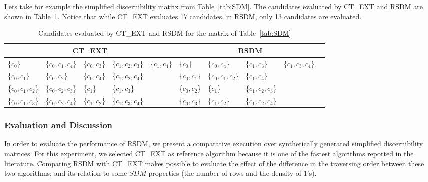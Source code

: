 \documentclass[authoryear,11pt]{elsarticle}
\begin{document}
	Lets take for example the simplified discernibility matrix from Table~\ref{tab:SDM}. The candidates evaluated 
	by CT\_EXT and RSDM  are shown in Table~\ref{tab:run}. Notice that while CT\_EXT evaluates 17 candidates,
	in RSDM, only 13 candidates are evaluated. 
	
	\begin{table}[!htb]\small
		\setlength{\tabcolsep}{.1em}
		\caption{Candidates evaluated by CT\_EXT and RSDM for the matrix of Table~\ref{tab:SDM}}\label{tab:run}
      	\centering
    		\begin{tabular}{|lllll|lllll|}
    		\hline
    		\multicolumn{5}{|c|}{CT\_EXT} & \multicolumn{5}{c|}{RSDM}\\
    		\hline
    		\{$ c_0$\} 	 		& \{$c_0,c_1,c_4$\}	& \{$c_0,c_3$\}		& \{$c_1,c_2,c_3$\}	& \{$c_1,c_4$\}	
    		& \{$c_0$\}			& \{$c_0,c_4$\} 		& \{$c_1,c_3$\} 		& \{$c_1,c_3,c_4$\}	&\\
    		\{$c_0,c_1$\} 		& \{$c_0,c_2$\}  	& \{$c_0,c_4$\}		& \{$c_1,c_2,c_4$\}	& 
    		& \{$c_0,c_1$\}		& \{$c_0,c_1,c_2$\} 	& \{$c_1,c_4$\}		&&\\
    		\{$c_0,c_1,c_2$\}	& \{$c_0,c_2,c_3$\}	& \{$c_1$\}			& \{$c_1,c_3$\}	  	&			
    		& \{$c_0,c_2$\} 		& \{$c_1$\}		 	& \{$c_1,c_2,c_3$\}	&&\\
    		\{$c_0,c_1,c_3$\} 	& \{$c_0,c_2,c_4$\}	& \{$c_1,c_2$\} 		& \{$c_1,c_3,c_4$\}	&			
    		& \{$c_0,c_3$\} 		& \{$c_1,c_2$\}	 	& \{$c_1,c_2,c_4$\}	&&\\
    		\hline
		\end{tabular}
	\end{table}

\subsubsection{Evaluation and Discussion}
	In order to evaluate the performance of RSDM, we present a comparative execution over synthetically generated 
	simplified discernibility matrices. For this experiment, we selected CT\_EXT as reference algorithm because 
	it is one of the fastest algorithms reported in the literature. Comparing RSDM with CT\_EXT makes possible to
	evaluate the effect of the difference in the traversing order between these two algorithms; and its relation 
	to some 	$SDM$ properties (the number of rows and the density of 1's). 
	
\end{document}
